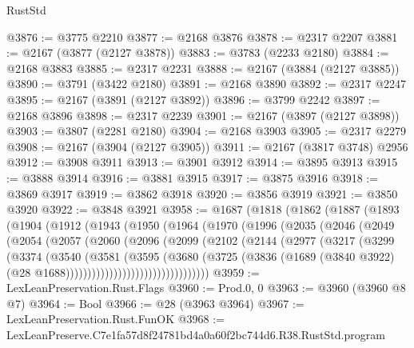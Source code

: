\begin{lexlean}{RustStd}
\begin{coremodule}
@3876 := @3775 @2210
@3877 := @2168 @3876
@3878 := @2317 @2207
@3881 := @2167 (@3877 (@2127 @3878))
@3883 := @3783 (@2233 @2180)
@3884 := @2168 @3883
@3885 := @2317 @2231
@3888 := @2167 (@3884 (@2127 @3885))
@3890 := @3791 (@3422 @2180)
@3891 := @2168 @3890
@3892 := @2317 @2247
@3895 := @2167 (@3891 (@2127 @3892))
@3896 := @3799 @2242
@3897 := @2168 @3896
@3898 := @2317 @2239
@3901 := @2167 (@3897 (@2127 @3898))
@3903 := @3807 (@2281 @2180)
@3904 := @2168 @3903
@3905 := @2317 @2279
@3908 := @2167 (@3904 (@2127 @3905))
@3911 := @2167 (@3817 @3748) @2956
@3912 := @3908 @3911
@3913 := @3901 @3912
@3914 := @3895 @3913
@3915 := @3888 @3914
@3916 := @3881 @3915
@3917 := @3875 @3916
@3918 := @3869 @3917
@3919 := @3862 @3918
@3920 := @3856 @3919
@3921 := @3850 @3920
@3922 := @3848 @3921
@3958 := @1687
    (@1818
      (@1862
        (@1887
          (@1893
            (@1904
              (@1912
                (@1943
                  (@1950
                    (@1964
                      (@1970
                        (@1996
                          (@2035
                            (@2046
                              (@2049
                                (@2054
                                  (@2057
                                    (@2060
                                      (@2096
                                        (@2099
                                          (@2102
                                            (@2144
                                              (@2977
                                                (@3217
                                                  (@3299
                                                    (@3374
                                                      (@3540
                                                        (@3581
                                                          (@3595
                                                            (@3680
                                                              (@3725
                                                                (@3836
                                                                  (@1689
                                                                    (@3840 @3922)
                                                                    (@28
                                                                      @1688)))))))))))))))))))))))))))))))))
@3959 := LexLeanPreservation.Rust.Flags
@3960 := Prod.{0, 0}
@3963 := @3960 (@3960 @8 @7)
@3964 := Bool
@3966 := @28 (@3963 @3964)
@3967 := LexLeanPreservation.Rust.FunOK
@3968 := LexLeanPreserve.C7e1fa57d8f24781bd4a0a60f2bc744d6.R38.RustStd.program

\end{coremodule}
\end{lexlean}
